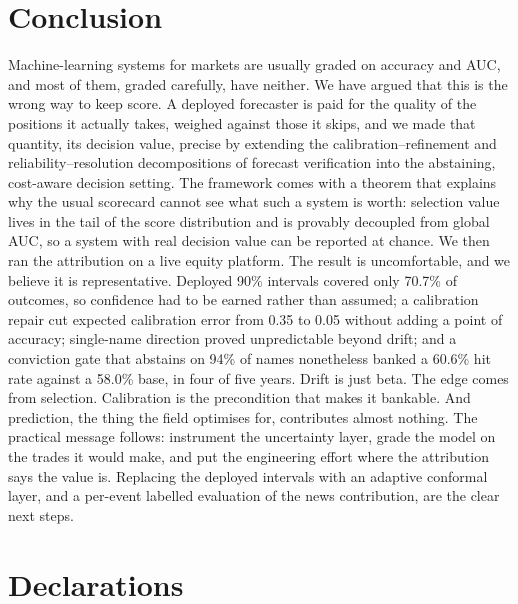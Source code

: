\documentclass{sbc2023}%
\theoremstyle{definition}
\theoremstyle{plain}
\begin{document}
\section{Conclusion}
\label{sec:conclusion}
Machine-learning systems for markets are usually graded on accuracy and AUC, and most
of them, graded carefully, have neither. We have argued that this is the wrong way to
keep score. A deployed forecaster is paid for the quality of the positions it actually
takes, weighed against those it skips, and we made that quantity, its decision value,
precise by extending the calibration--refinement and reliability--resolution
decompositions of forecast verification into the abstaining, cost-aware decision
setting. The framework comes with a theorem that explains why the usual scorecard
cannot see what such a system is worth: selection value lives in the tail of the score
distribution and is provably decoupled from global AUC, so a system with real decision
value can be reported at chance. We then ran the attribution on a live equity platform.
The result is uncomfortable, and we believe it is representative. Deployed 90\%
intervals covered only 70.7\% of outcomes, so confidence had to be earned rather than
assumed; a calibration repair cut expected calibration error from 0.35 to 0.05 without
adding a point of accuracy; single-name direction proved unpredictable beyond drift;
and a conviction gate that abstains on 94\% of names nonetheless banked a 60.6\% hit
rate against a 58.0\% base, in four of five years. Drift is just beta. The edge comes
from selection. Calibration is the precondition that makes it bankable. And
prediction, the thing the field optimises for, contributes almost nothing. The
practical message follows: instrument the uncertainty layer, grade the model on the
trades it would make, and put the engineering effort where the attribution says the
value is. Replacing the deployed intervals with an adaptive conformal layer, and a
per-event labelled evaluation of the news contribution, are the clear next steps.


\section*{Declarations}
\end{document}
